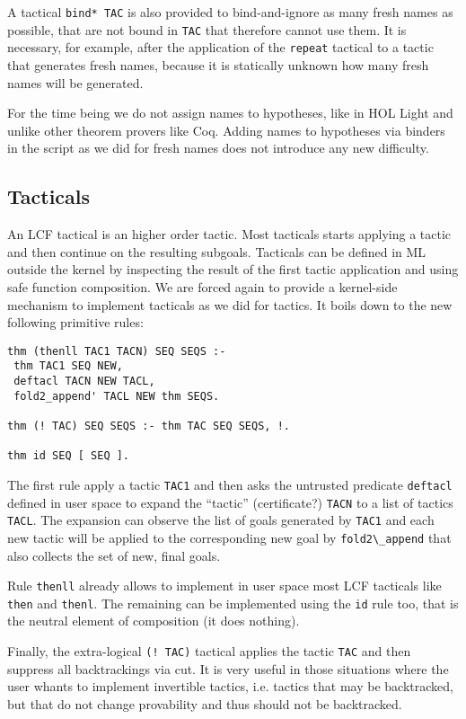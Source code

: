 \documentclass[preprint]{sigplanconf}
\begin{document}
A tactical \verb+bind* TAC+ is also provided to bind-and-ignore as many fresh names as possible, that are not bound in \verb+TAC+ that therefore cannot use them. It is necessary, for example, after the application of the \verb+repeat+ tactical to a tactic that generates fresh names, because it is statically unknown how many fresh names will be generated.

For the time being we do not assign names to hypotheses, like in HOL Light and unlike other theorem provers like Coq. Adding names to hypotheses via binders in the script as we did for fresh names does not introduce any new difficulty.

\subsection{Tacticals}
An LCF tactical is an higher order tactic. Most tacticals starts applying a tactic and then continue on the resulting subgoals. Tacticals can be defined in ML outside the kernel by inspecting the result of the first tactic application and using safe function composition. We are forced again to provide a kernel-side mechanism to implement tacticals as we did for tactics. It boils down to the new following primitive rules:

\begin{small}
\begin{verbatim}
thm (thenll TAC1 TACN) SEQ SEQS :-
 thm TAC1 SEQ NEW,
 deftacl TACN NEW TACL,
 fold2_append' TACL NEW thm SEQS.

thm (! TAC) SEQ SEQS :- thm TAC SEQ SEQS, !.

thm id SEQ [ SEQ ].
\end{verbatim}
\end{small}

The first rule apply a tactic \verb+TAC1+ and then asks the untrusted predicate \verb+deftacl+ defined in user space to expand the ``tactic'' (certificate?) \verb+TACN+ to a list of tactics \verb+TACL+. The expansion can observe the list of goals generated by \verb+TAC1+ and each new tactic will be applied to the corresponding new goal by \verb+fold2\_append+ that also collects the set of new, final goals.

Rule \verb+thenll+ already allows to implement in user space most LCF tacticals like \verb+then+ and \verb+thenl+. The remaining can be implemented using the \verb+id+ rule too, that is the neutral element of composition (it does nothing).

Finally, the extra-logical \verb+(! TAC)+ tactical applies the tactic \verb+TAC+ and then suppress all backtrackings via cut. It is very useful in those situations where the user whants to implement invertible tactics, i.e. tactics that may be backtracked, but that do not change provability and thus should not be backtracked.
\end{document}
